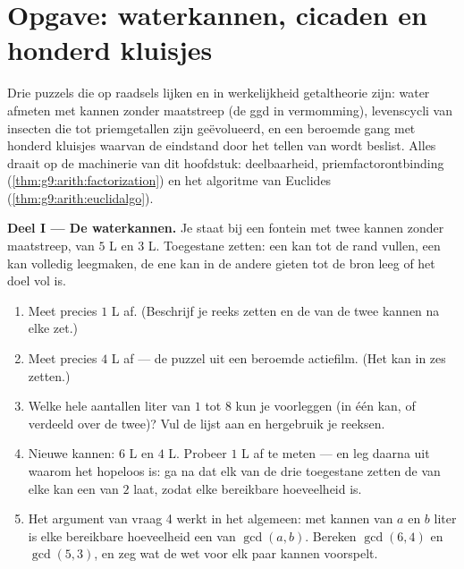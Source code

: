 \section{Opgave: waterkannen, cicaden en honderd kluisjes}

\begin{problem}
\label{pb:g9:arith:1}
Drie puzzels die op raadsels lijken en in werkelijkheid getaltheorie zijn: water
afmeten met kannen zonder maatstreep (de ggd in vermomming), levenscycli van
insecten die tot priemgetallen zijn geëvolueerd, en een beroemde gang met honderd
kluisjes waarvan de eindstand door het tellen van  wordt beslist. Alles
draait op de machinerie van dit hoofdstuk: deelbaarheid, priemfactorontbinding
(\cref{thm:g9:arith:factorization}) en het algoritme van Euclides
(\cref{thm:g9:arith:euclidalgo}).

\medskip
\noindent\textbf{Deel I --- De waterkannen.}
Je staat bij een fontein met twee kannen zonder maatstreep, van $5$ L en $3$ L.
Toegestane zetten: een kan tot de rand vullen, een kan volledig leegmaken, de ene
kan in de andere gieten tot de bron leeg of het doel vol is.
\begin{enumerate}
  \item Meet precies $1$ L af. (Beschrijf je reeks zetten en de  van de twee
        kannen na elke zet.)
  \item Meet precies $4$ L af --- de puzzel uit een beroemde actiefilm. (Het kan
        in zes zetten.)
  \item Welke hele aantallen liter van $1$ tot $8$ kun je voorleggen (in één kan,
        of verdeeld over de twee)? Vul de lijst aan en hergebruik je reeksen.
  \item Nieuwe kannen: $6$ L en $4$ L. Probeer $1$ L af te meten --- en leg daarna
        uit waarom het hopeloos is: ga na dat elk van de drie toegestane zetten de
         van elke kan een  van $2$ laat, zodat elke bereikbare
        hoeveelheid  is.
  \item Het argument van vraag 4 werkt in het algemeen: met kannen van $a$ en $b$
        liter is elke bereikbare hoeveelheid een  van $\gcd(a, b)$.
        Bereken $\gcd(6, 4)$ en $\gcd(5, 3)$, en zeg wat de wet voor elk paar
        kannen voorspelt.
\end{enumerate}


\end{problem}
